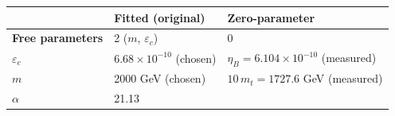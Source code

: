 \documentclass[
  11pt,
]{article}
\begin{document}
\begin{longtable}[]{@{}lll@{}}
\toprule
\begin{minipage}[b]{0.30\columnwidth}\raggedright
\strut
\end{minipage} & \begin{minipage}[b]{0.30\columnwidth}\raggedright
Fitted (original)\strut
\end{minipage} & \begin{minipage}[b]{0.30\columnwidth}\raggedright
Zero-parameter\strut
\end{minipage}\tabularnewline
\midrule
\endhead
\begin{minipage}[t]{0.30\columnwidth}\raggedright
\textbf{Free parameters}\strut
\end{minipage} & \begin{minipage}[t]{0.30\columnwidth}\raggedright
2 (\(m\), \(\varepsilon_c\))\strut
\end{minipage} & \begin{minipage}[t]{0.30\columnwidth}\raggedright
0\strut
\end{minipage}\tabularnewline
\begin{minipage}[t]{0.30\columnwidth}\raggedright
\(\varepsilon_c\)\strut
\end{minipage} & \begin{minipage}[t]{0.30\columnwidth}\raggedright
\(6.68 \times 10^{-10}\) (chosen)\strut
\end{minipage} & \begin{minipage}[t]{0.30\columnwidth}\raggedright
\(\eta_B = 6.104 \times 10^{-10}\) (measured)\strut
\end{minipage}\tabularnewline
\begin{minipage}[t]{0.30\columnwidth}\raggedright
\(m\)\strut
\end{minipage} & \begin{minipage}[t]{0.30\columnwidth}\raggedright
2000 GeV (chosen)\strut
\end{minipage} & \begin{minipage}[t]{0.30\columnwidth}\raggedright
\(10\,m_t = 1727.6\) GeV (measured)\strut
\end{minipage}\tabularnewline
\begin{minipage}[t]{0.30\columnwidth}\raggedright
\(\alpha\)\strut
\end{minipage} & \begin{minipage}[t]{0.30\columnwidth}\raggedright
21.13\strut
\end{minipage} & \begin{minipage}[t]{0.30\columnwidth}\raggedright

\end{minipage}
\end{longtable}
\end{document}
